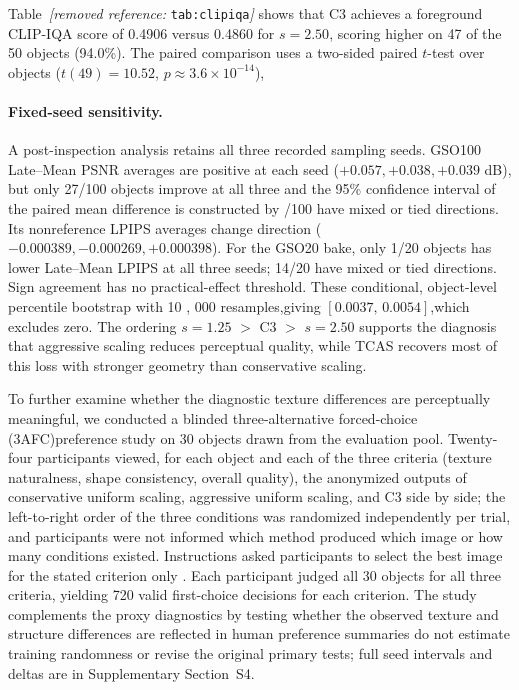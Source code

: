 \documentclass[times,twocolumn,final]{elsarticle}
\providecommand{\DIFadd}[1]{{\protect\color{blue} \sf #1}} %
\providecommand{\DIFdel}[1]{{\protect\color{red} \scriptsize #1}} %
\providecommand{\DIFaddbegin}{} %
\providecommand{\DIFaddend}{} %
\providecommand{\DIFdelbegin}{} %
\providecommand{\DIFdelend}{} %
\begin{document}
\DIFdelbegin \DIFdel{Table~\textit{[removed reference: }\texttt{tab:clipiqa}\textit{]} shows that C3 achieves a foreground CLIP-IQA score of 0.4906 versus 0.4860 for $s = 2.50$, scoring higher on 47 of the 50 objects (94.0\%).
The paired comparison uses a two-sided paired $t$-test over objects ($t(49)=10.52$, $p\approx3.6\times10^{-14}$), }\DIFdelend \DIFaddbegin \paragraph{Fixed-seed sensitivity.}
\DIFadd{A post-inspection analysis retains all three recorded sampling seeds. GSO100 Late--Mean PSNR averages are positive at each seed ($+0.057,+0.038,+0.039$ dB), but only 27/100 objects improve at all three }\DIFaddend and \DIFdelbegin \DIFdel{the 95\% confidence interval of the paired mean difference is constructed by }\DIFdelend \DIFaddbegin \DIFadd{68/100 have mixed or tied directions. Its nonreference LPIPS averages change direction ($-0.000389,-0.000269,+0.000398$). For the GSO20 bake, only 1/20 objects has lower Late--Mean LPIPS at all three seeds; 14/20 have mixed or tied directions. Sign agreement has no practical-effect threshold. These conditional, }\DIFaddend object-level \DIFdelbegin \DIFdel{percentile bootstrap with 10}%
\DIFdel{, }%
\DIFdel{000 resamples,giving $[0.0037,\,0.0054]$,which excludes zero. The ordering $s = 1.25$ $>$ C3 $>$ $s = 2.50$ supports the diagnosis that aggressive scaling reduces perceptual quality, while TCAS recovers most of this loss with stronger geometry than conservative scaling.
}%

\DIFdel{To further examine whether the diagnostic texture differences are perceptually meaningful, we conducted a blinded three-alternative forced-choice (3AFC)preference study on 30 objects drawn from the evaluation pool. Twenty-four participants viewed, for each object and each of the three criteria (texture naturalness, shape consistency, overall quality), the anonymized outputs of conservative uniform scaling, aggressive uniform scaling, and C3 side by side; the left-to-right order of the three conditions was randomized independently per trial, and participants were not informed which method produced which image or how many conditions existed. Instructions asked participants to select the best image for the stated criterion only . Each participant judged all 30 objects for all three criteria, yielding 720 valid first-choice decisions for each criterion. The study complements the proxy diagnostics by testing whether the observed texture and structure differences are reflected in human preference}\DIFdelend \DIFaddbegin \DIFadd{summaries do not estimate training randomness or revise the original primary tests; full seed intervals and deltas are in Supplementary Section~S4}\DIFaddend .
\end{document}
